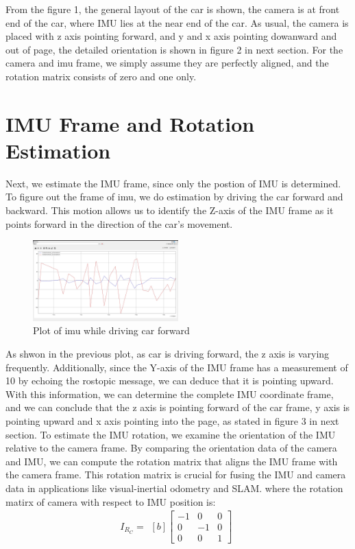 \documentclass{article}
\begin{document}
\noindent
From the figure 1, the general layout of the car is shown, the camera is 
at front end of the car, where IMU lies at the near end of the car. As usual, the
camera is placed with z axis pointing forward, and y and x axis pointing dowanward 
and out of page, the detailed orientation is shown in figure 2 in next section.
For the camera and imu frame, we simply assume they are perfectly aligned, and 
the rotation matrix consists of zero and one only.


\section*{IMU Frame and Rotation Estimation}
Next, we estimate the IMU frame, 
since only the postion of IMU is determined. To figure out
the frame of imu, we do estimation
by driving the car forward and backward. 
This motion allows us to identify 
the Z-axis of the IMU frame as 
it points forward in the direction of the car's movement.
\begin{figure}[H]
    \centering
    \includegraphics[width=0.5\textwidth]{imuplot.jpeg}
    \caption{Plot of imu while driving car forward}
    \label{fig:IMU plot}
\end{figure}
\noindent
As shwon in the previous plot, as car is driving forward, the z axis is varying frequently.
 Additionally, since the Y-axis of the IMU frame has a measurement of 10 by echoing 
 the rostopic message, we can deduce that it is pointing upward. 
 With this information, we can determine the complete IMU coordinate frame, and we can conclude
 that the z axis is pointing forward of the car frame, y axis is pointing upward and x axis pointing 
 into the page, as stated in figure 3 in next section.
\noindent
To estimate the IMU rotation, we examine the orientation of the IMU relative to the camera frame. 
By comparing the orientation data of the camera and IMU, we can compute the rotation matrix that aligns the IMU 
frame with the camera frame. This rotation matrix is crucial for fusing the IMU and camera data in applications 
like visual-inertial odometry and SLAM.
where the rotation matirx of camera with respect to IMU position is: 
\begin{equation}
    I_{R_C} = 
    \begin{aligned}[b]
        \begin{bmatrix}
            -1 & 0 & 0 \\
            0 & -1 & 0 \\
            0 & 0 & 1
        \end{bmatrix}
    \end{aligned}
\end{equation}
\end{document}
